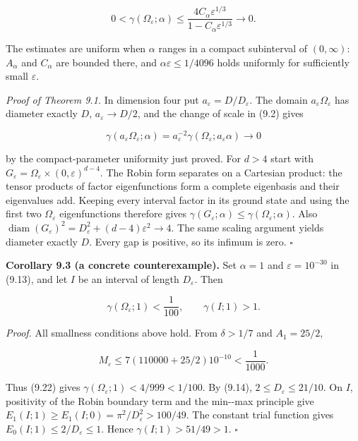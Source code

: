 \documentclass[11pt]{article}
\begin{document}
\[
0<\gamma(\Omega_\varepsilon;\alpha)
\le\frac{4C_\alpha\varepsilon^{1/3}}
 {1-C_\alpha\varepsilon^{1/3}}
\longrightarrow0.
\tag{9.23}
\]

The estimates are uniform when \(\alpha\) ranges in a compact
subinterval of \((0,\infty)\): \(A_\alpha\) and \(C_\alpha\) are bounded
there, and \(\alpha\varepsilon\le1/4096\) holds uniformly for
sufficiently small \(\varepsilon\).

\emph{Proof of Theorem 9.1.} In dimension four put
\(a_\varepsilon=D/D_\varepsilon\). The domain
\(a_\varepsilon\Omega_\varepsilon\) has diameter exactly \(D\),
\(a_\varepsilon\to D/2\), and the change of scale in (9.2) gives

\[
\gamma(a_\varepsilon\Omega_\varepsilon;\alpha)
=a_\varepsilon^{-2}
 \gamma(\Omega_\varepsilon;a_\varepsilon\alpha)\longrightarrow0
\tag{9.24}
\]

by the compact-parameter uniformity just proved. For \(d>4\) start with
\(G_\varepsilon=\Omega_\varepsilon\times(0,\varepsilon)^{d-4}\). The
Robin form separates on a Cartesian product: the tensor products of
factor eigenfunctions form a complete eigenbasis and their eigenvalues
add. Keeping every interval factor in its ground state and using the
first two \(\Omega_\varepsilon\) eigenfunctions therefore gives
\(\gamma(G_\varepsilon;\alpha)\le\gamma(\Omega_\varepsilon;\alpha)\).
Also
\(\operatorname{diam}(G_\varepsilon)^2=D_\varepsilon^2+(d-4)\varepsilon^2\to4\).
The same scaling argument yields diameter exactly \(D\). Every gap is
positive, so its infimum is zero. \(\square\)

\textbf{Corollary 9.3 (a concrete counterexample).} Set \(\alpha=1\) and
\(\varepsilon=10^{-30}\) in (9.13), and let \(I\) be an interval of
length \(D_\varepsilon\). Then

\[
\gamma(\Omega_\varepsilon;1)<\frac1{100},
\qquad \gamma(I;1)>1.
\tag{9.25}
\]

\emph{Proof.} All smallness conditions above hold. From \(\delta>1/7\)
and \(A_1=25/2\),

\[
M_\varepsilon\le7(110000+25/2)10^{-10}
<\frac1{1000}.
\tag{9.26}
\]

Thus (9.22) gives \(\gamma(\Omega_\varepsilon;1)<4/999<1/100\). By
(9.14), \(2\le D_\varepsilon\le21/10\). On \(I\), positivity of the
Robin boundary term and the min-\/-max principle give
\(E_1(I;1)\ge E_1(I;0)=\pi^2/D_\varepsilon^2>100/49\). The constant
trial function gives \(E_0(I;1)\le2/D_\varepsilon\le1\). Hence
\(\gamma(I;1)>51/49>1\). \(\square\)
\end{document}
